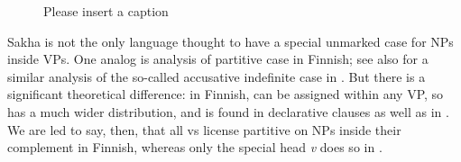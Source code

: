 \documentclass[output=paper]{langsci/langscibook}
\begin{document}
\begin{figure}
    \caption{\color{red}Please insert a caption\label{fig:ex:12.21b}}
\end{figure}

Sakha is not the only language thought to have a special unmarked case for NPs
inside VPs. One analog is  analysis of partitive
case in Finnish; see also \citet{Baker2017} for a similar analysis of the
so-called accusative indefinite case in . But there is a significant
theoretical difference: in Finnish,  can be assigned within any
VP, so  has a much wider distribution, and is found in
declarative clauses as well as in . We are led to say, then, that
all vs license partitive on NPs inside their complement in Finnish, whereas
only the special head \emph{v}\textsubscript{\Imp} does so in .
\end{document}
